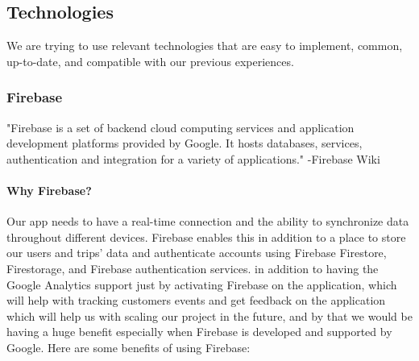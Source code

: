 \documentclass[a4paper, 12pt]{report} %
\begin{document}
        \subsection{Technologies}
            We are trying to use relevant technologies that are easy to implement, common, up-to-date, and compatible with our previous experiences.
            \subsubsection{Firebase}
                "Firebase is a set of backend cloud computing services and application development platforms provided by Google. It hosts databases, services, authentication and integration for a variety of applications." -Firebase Wiki \cite{firebase_wiki}
                
                \paragraph{Why Firebase?} 
                
                Our app needs to have a real-time connection and the ability to synchronize data throughout different devices. Firebase enables this in addition to a place to store our users and trips' data and authenticate accounts using Firebase Firestore, Firestorage, and Firebase authentication services. in addition to having the Google Analytics support just by activating Firebase on the application, which will help with tracking customers events and get feedback on the application which will help us with scaling our project in the future, and by that we would be having a huge benefit especially when Firebase is developed and supported by Google. Here are some benefits of using Firebase:
                
\end{document}
